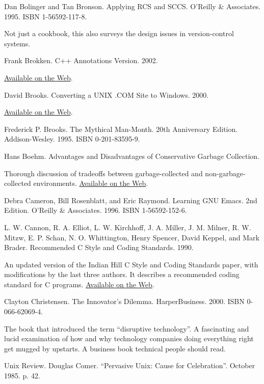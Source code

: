 \documentclass[12pt,oneside]{book}
\begin{document}
\begin{common-format}
\begin{thebibliography}{9}
 Dan Bolinger and Tan Bronson. Applying RCS and SCCS. O'Reilly \&{} Associates. 1995. ISBN 1-56592-117-8.

Not just a cookbook, this also surveys the design issues in version-control systems.

 Frank Brokken. C++ Annotations Version. 2002.

\href{http://www.icce.rug.nl/documents/cplusplus/cplusplus.html}{Available on the Web}.

 David Brooks. Converting a UNIX .COM Site to Windows. 2000.

\href{http://www.securityoffice.net/mssecrets/hotmail.html#_Toc491601819}{Available on the Web}.

 Frederick P. Brooks. The Mythical Man-Month. 20th Anniversary Edition. Addison-Wesley. 1995. ISBN 0-201-83595-9.

 Hans Boehm. Advantages and Disadvantages of Conservative Garbage Collection.

Thorough discussion of tradeoffs between garbage-collected and non-garbage-collected environments. \href{http://www.hpl.hp.com/personal/Hans_Boehm/gc/issues.html}{Available on the Web}.

 Debra Cameron, Bill Rosenblatt, and Eric Raymond. Learning GNU Emacs. 2nd Edition. O'Reilly \&{} Associates. 1996. ISBN 1-56592-152-6.

 L. W. Cannon, R. A. Elliot, L. W. Kirchhoff, J. A. Miller, J. M. Milner, R. W. Mitzw, E. P. Schan, N. O. Whittington, Henry Spencer, David Keppel, and Mark Brader. Recommended C Style and Coding Standards. 1990.

An updated version of the Indian Hill C Style and Coding Standards paper, with modifications by the last three authors. It describes a recommended coding standard for C programs. \href{http://www.apocalypse.org/pub/u/paul/docs/cstyle/cstyle.htm}{Available on the Web}.

 Clayton Christensen. The Innovator's Dilemma. HarperBusiness. 2000. ISBN 0-066-62069-4.

The book that introduced the term “disruptive technology”. A fascinating and lucid examination of how and why technology companies doing everything right get mugged by upstarts. A business book technical people should read.

 Unix Review. Douglas Comer. “Pervasive Unix: Cause for Celebration”. October 1985. p. 42.


\end{thebibliography}
\end{common-format}
\end{document}
